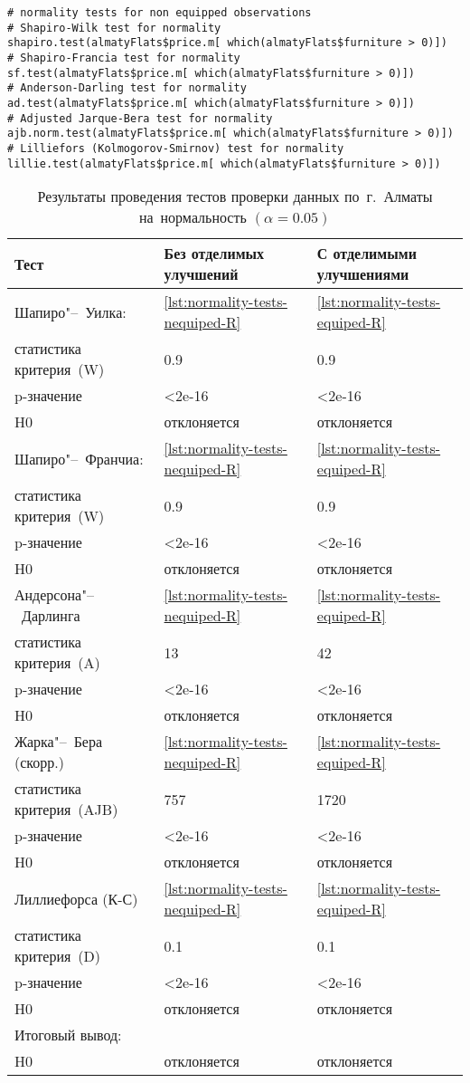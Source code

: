 \documentclass[]{scrreprt}
\begin{document}
%
\begin{lstlisting}[float, caption = Проведение тестов на~нормальность для~наблюдений с~отделимыми улучшениями, firstnumber=1, label= lst:normality-tests-equiped-R]
# normality tests for non equipped observations
# Shapiro-Wilk test for normality
shapiro.test(almatyFlats$price.m[ which(almatyFlats$furniture > 0)])
# Shapiro-Francia test for normality
sf.test(almatyFlats$price.m[ which(almatyFlats$furniture > 0)])
# Anderson-Darling test for normality
ad.test(almatyFlats$price.m[ which(almatyFlats$furniture > 0)])
# Adjusted Jarque-Bera test for normality
ajb.norm.test(almatyFlats$price.m[ which(almatyFlats$furniture > 0)])
# Lilliefors (Kolmogorov-Smirnov) test for normality
lillie.test(almatyFlats$price.m[ which(almatyFlats$furniture > 0)])
\end{lstlisting}
%

\begin{table}[ht]
	\caption{Результаты проведения тестов проверки данных по~г.~Алматы на~нормальность $({\textstyle \alpha=0.05})$}\label{tab:normality-tests-values-R}
	\centering
	\begin{tabular}{lll}
		\hline
		Тест&Без отделимых улучшений&С отделимыми улучшениями\\
		\hline
		Шапиро"--~Уилка:&\ref{lst:normality-tests-nequiped-R}&\ref{lst:normality-tests-equiped-R}\\
		статистика критерия~(W)&0.9&0.9\\
		p-значение&<2e-16&<2e-16\\
		H0&отклоняется&отклоняется\\
		\hline
		Шапиро"--~Франчиа:&\ref{lst:normality-tests-nequiped-R}&\ref{lst:normality-tests-equiped-R}\\
		статистика критерия~(W)&0.9&0.9\\
		p-значение&<2e-16&<2e-16\\
		H0&отклоняется&отклоняется\\
		\hline
		Андерсона"--~Дарлинга&\ref{lst:normality-tests-nequiped-R}&\ref{lst:normality-tests-equiped-R}\\
		статистика критерия~(A)&13&42\\
		p-значение&<2e-16&<2e-16\\
		H0&отклоняется&отклоняется\\
		\hline
		Жарка"--~Бера (скорр.)&\ref{lst:normality-tests-nequiped-R}&\ref{lst:normality-tests-equiped-R}\\
		статистика критерия~(AJB)&757&1720\\
		p-значение&<2e-16&<2e-16\\
		H0&отклоняется&отклоняется\\
		\hline
		Лиллиефорса (К-С)&\ref{lst:normality-tests-nequiped-R}&\ref{lst:normality-tests-equiped-R}\\
		статистика критерия~(D)&0.1&0.1\\
		p-значение&<2e-16&<2e-16\\
		H0&отклоняется&отклоняется\\
		\hline
		Итоговый вывод:&&\\
		H0&отклоняется&отклоняется\\
		\hline
	\end{tabular}
\end{table}
\end{document}
